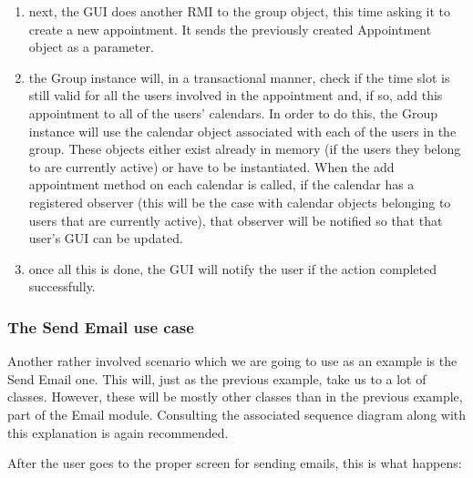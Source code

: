 \documentclass[a4paper,10pt]{article}
\begin{document}
\begin{enumerate}
\item next, the GUI does another RMI to the group object, this time asking it to create a new appointment.
It sends the previously created Appointment object as a parameter.

\item the Group instance will, in a transactional manner, check if the time slot is still valid for
all the users involved in the appointment and, if so, add this appointment to all of the users'
calendars. In order to do this, the Group instance will use the calendar object associated with
each of the users in the group. These objects either exist already in memory (if the users they
belong to are currently active) or have to be instantiated. When the add appointment method
on each calendar is called, if the calendar has a registered observer (this will be the case with
calendar objects belonging to users that are currently active), that observer will be notified so
that that user's GUI can be updated.

\item once all this is done, the GUI will notify the user if the action completed successfully.

\end{enumerate}

\subsubsection*{The Send Email use case}

Another rather involved scenario which we are going to use as an example is the Send Email
one. This will, just as the previous example, take us to a lot of classes. However, these will be
mostly other classes than in the previous example, part of the Email module. Consulting the
associated sequence diagram along with this explanation is again recommended.

After the user goes to the proper screen for sending emails, this is what happens:
\end{document}
